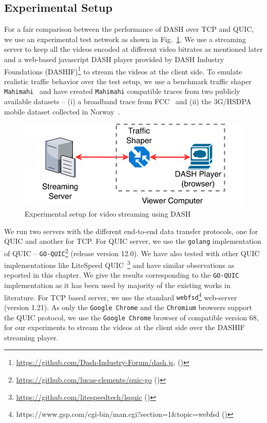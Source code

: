 \subsection{Experimental Setup}
\label{chap03s2:sec:experimentalSetup}
For a fair comparison between the performance of DASH over TCP and QUIC,
we use an experimental test network as shown in Fig.~\ref{fig:chap03s2:expeirmental_setup}. We use a streaming server to keep all the videos encoded at different video bitrates as mentioned later and a web-based javascript DASH player provided by DASH Industry Foundations (DASHIF)\footnote{\url{https://github.com/Dash-Industry-Forum/dash.js}, (\lastaccessedtoday)} to stream the videos at the client side. To emulate realistic traffic behavior over the test setup, we use a benchmark traffic shaper {\tt Mahimahi}~\cite{mahimahi} and have created {\tt Mahimahi} compatible traces from two publicly available datasets -- (i) a broadband trace from FCC~\cite{dataset-fcc} and (ii) the 3G/HSDPA mobile dataset collected in Norway~\cite{dataset-norway}.

\begin{figure}[h]
	\centering
	\includegraphics[width=0.8\linewidth]{img/experimental_setup}
	\caption{\label{fig:chap03s2:expeirmental_setup}Experimental setup for video streaming using DASH}
\end{figure}

We run two servers with the different end-to-end data transfer protocols, one for QUIC and another for TCP. For QUIC server, we use the {\tt golang} implementation of QUIC -- \texttt{GO-QUIC}\footnote{\url{https://github.com/lucas-clemente/quic-go} (\lastaccessedtoday)} (release version 12.0). We have also tested with other QUIC implementations like LiteSpeed QUIC~\footnote{\url{https://github.com/litespeedtech/lsquic} (\lastaccessedtoday)} and have similar observations as reported in this chapter. We give the results corresponding to the \texttt{GO-QUIC} implementation as it has been used by majority of the existing works in literature. For TCP based server, we use the standard {\tt webfsd}\footnote{https://www.gsp.com/cgi-bin/man.cgi?section=1\&topic=webfsd (\lastaccessedtoday)} web-server (version 1.21). As only the {\tt Google Chrome} and the {\tt Chromium} browsers support the QUIC protocol, we use the {\tt Google Chrome} browser of compatible version 68, for our experiments to stream the videos at the client side over the DASHIF streaming player.


